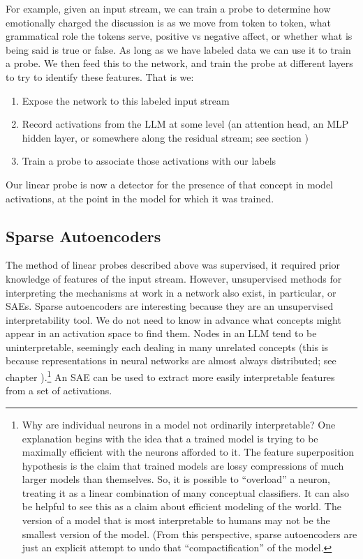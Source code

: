 For example, given an input stream, we can train a probe to determine how emotionally charged the discussion is as we move from token to token, what grammatical role the tokens serve, positive vs negative affect, or whether what is being said is true or false. As long as we have labeled data we can use it to train a probe. We then feed this to the network, and train the probe at different layers to try to identify these features. That is we:

\begin{enumerate}
\item Expose the network to this labeled input stream
\item Record activations from the LLM at some level (an attention head, an MLP hidden layer, or somewhere along the residual stream; see section )
\item Train a probe to associate those activations with our labels 

\end{enumerate}

Our linear probe is now a detector for the presence of that concept in model activations, at the point in the model for which it was trained.  

\subsection{Sparse Autoencoders}

The method of linear probes described above was supervised, it required prior knowledge of features of the input stream.  However, unsupervised methods for interpreting the mechanisms at work in a network also exist, in particular,  or SAEs.  Sparse autoencoders are interesting because they are an unsupervised interpretability tool. We do not need to know in advance what concepts might appear in an activation space to find them.  Nodes in an LLM tend to be uninterpretable, seemingly each dealing in many unrelated concepts (this is because representations in neural networks are almost always distributed; see chapter ).\footnote{Why are individual neurons in a model not ordinarily interpretable? One explanation begins with the idea that a trained model is trying to be maximally efficient with the neurons afforded to it. The feature superposition hypothesis is the claim that trained models are lossy compressions of much larger models than themselves. So, it is possible to ``overload'' a neuron, treating it as a linear combination of many conceptual classifiers. It can also be helpful to see this as a claim about efficient modeling of the world. The version of a model that is most interpretable to humans may not be the smallest version of the model. (From this perspective, sparse autoencoders are just an explicit attempt to undo that ``compactification'' of the model.}   An SAE can be used to extract more easily interpretable features from a set of activations. 

